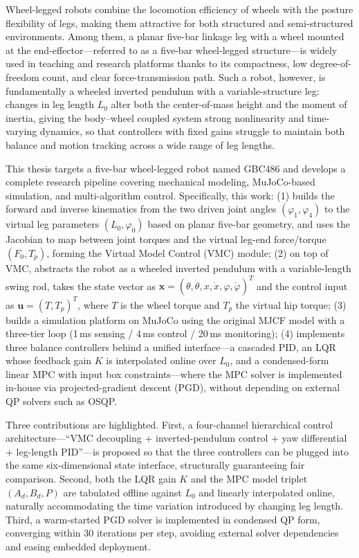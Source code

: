 \documentclass{smbuthesis}
\begin{document}
\begin{abstractEN}
\setlength{\parindent}{2em}

Wheel-legged robots combine the locomotion efficiency of wheels with the posture flexibility of legs, making them attractive for both structured and semi-structured environments. Among them, a planar five-bar linkage leg with a wheel mounted at the end-effector---referred to as a five-bar wheel-legged structure---is widely used in teaching and research platforms thanks to its compactness, low degree-of-freedom count, and clear force-transmission path. Such a robot, however, is fundamentally a wheeled inverted pendulum with a variable-structure leg: changes in leg length $L_0$ alter both the center-of-mass height and the moment of inertia, giving the body--wheel coupled system strong nonlinearity and time-varying dynamics, so that controllers with fixed gains struggle to maintain both balance and motion tracking across a wide range of leg lengths.

This thesis targets a five-bar wheel-legged robot named GBC486 and develops a complete research pipeline covering mechanical modeling, MuJoCo-based simulation, and multi-algorithm control. Specifically, this work: (1) builds the forward and inverse kinematics from the two driven joint angles $(\varphi_1, \varphi_4)$ to the virtual leg parameters $(L_0, \varphi_0)$ based on planar five-bar geometry, and uses the Jacobian to map between joint torques and the virtual leg-end force/torque $(F_0, T_p)$, forming the Virtual Model Control (VMC) module; (2) on top of VMC, abstracts the robot as a wheeled inverted pendulum with a variable-length swing rod, takes the state vector as $\mathbf{x} = (\theta, \dot\theta, x, \dot x, \varphi, \dot\varphi)^T$ and the control input as $\mathbf{u} = (T, T_p)^T$, where $T$ is the wheel torque and $T_p$ the virtual hip torque; (3) builds a simulation platform on MuJoCo using the original MJCF model with a three-tier loop (1\,ms sensing / 4\,ms control / 20\,ms monitoring); (4) implements three balance controllers behind a unified interface---a cascaded PID, an LQR whose feedback gain $K$ is interpolated online over $L_0$, and a condensed-form linear MPC with input box constraints---where the MPC solver is implemented in-house via projected-gradient descent (PGD), without depending on external QP solvers such as OSQP.

Three contributions are highlighted. First, a four-channel hierarchical control architecture---``VMC decoupling + inverted-pendulum control + yaw differential + leg-length PID''---is proposed so that the three controllers can be plugged into the same six-dimensional state interface, structurally guaranteeing fair comparison. Second, both the LQR gain $K$ and the MPC model triplet $(A_d, B_d, P)$ are tabulated offline against $L_0$ and linearly interpolated online, naturally accommodating the time variation introduced by changing leg length. Third, a warm-started PGD solver is implemented in condensed QP form, converging within 30 iterations per step, avoiding external solver dependencies and easing embedded deployment.


\end{abstractEN}
\end{document}
